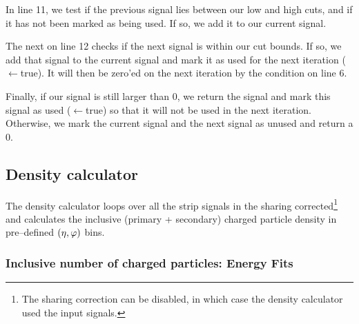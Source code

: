 \documentclass[11pt]{article}
\def\AlwaysText#1{\ifmmode\relax\text{#1}\else #1\fi}
\newcommand{\AbbrName}[1]{\AlwaysText{{\scshape #1}}}
\newcommand{\ESD}{\AbbrName{esd}}
\newcommand{\etaphi}{\ensuremath(\eta,\varphi)}
\begin{document}
In line 11, %
we test if the previous signal lies between our low and
high cuts, and if it has not been marked as being used.  If so, we add
it to our current signal.  

The next  on line 12 %
checks if the next signal is within our
cut bounds.  If so, we add that signal to the current signal and mark
it as used for the next iteration ($\leftarrow$true).  It will then be zero'ed on the next
iteration by the condition on line 6.

Finally, if our signal is still larger than 0, we return the signal
and mark this signal as used ($\leftarrow$true) so that it will not be used in the next
iteration. Otherwise, we mark the current signal and the next signal
as unused and return a 0. 


\subsection{Density calculator}
\label{sec:sub:density_calculator}

The density calculator loops over all the strip signals in the sharing
corrected\footnote{The sharing correction can be disabled, in which
  case the density calculator used the input \ESD{} signals.} \ESD{}
and calculates the inclusive (primary + secondary) charged particle
density in pre--defined $\etaphi$ bins.

\subsubsection{Inclusive number of charged particles: Energy Fits} 
\label{sec:sub:sub:eloss_fits}
\end{document}

